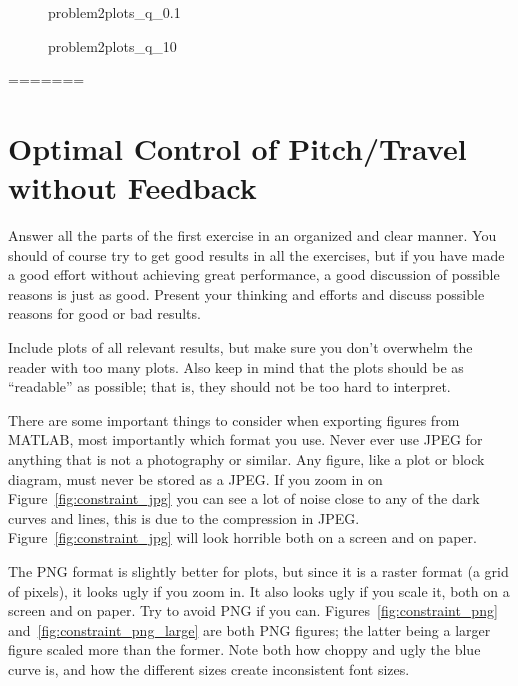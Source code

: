 \begin{figure}[htbp]
	\centering
	\caption{problem2plots\_q\_0.1}
	\label{fig:problem2plots_q_0.1}%
\end{figure}

\begin{figure}[htbp]
	\centering
	\caption{problem2plots\_q\_10}
	\label{fig:problem2plots_q_10}%
\end{figure}


=======
\section{Optimal Control of Pitch/Travel without Feedback}\label{sec:prob2}
Answer all the parts of the first exercise in an organized and clear manner. You should of course try to get good results in all the exercises, but if you have made a good effort without achieving great performance, a good discussion of possible reasons is just as good. Present your thinking and efforts and discuss possible reasons for good or bad results.

Include plots of all relevant results, but make sure you don't overwhelm the reader with too many plots. Also keep in mind that the plots should be as ``readable'' as possible; that is, they should not be too hard to interpret.

There are some important things to consider when exporting figures from MATLAB, most importantly which format you use. Never ever use JPEG for anything that is not a photography or similar. Any figure, like a plot or block diagram, must never be stored as a JPEG. If you zoom in on Figure~\ref{fig:constraint_jpg} you can see a lot of noise close to any of the dark curves and lines, this is due to the compression in JPEG. Figure~\ref{fig:constraint_jpg} will look horrible both on a screen and on paper.

The PNG format is slightly better for plots, but since it is a raster format (a grid of pixels), it looks ugly if you zoom in. It also looks ugly if you scale it, both on a screen and on paper. Try to avoid PNG if you can. Figures~\ref{fig:constraint_png} and~\ref{fig:constraint_png_large} are both PNG figures; the latter being a larger figure scaled more than the former. Note both how choppy and ugly the blue curve is, and how the different sizes create inconsistent font sizes.

